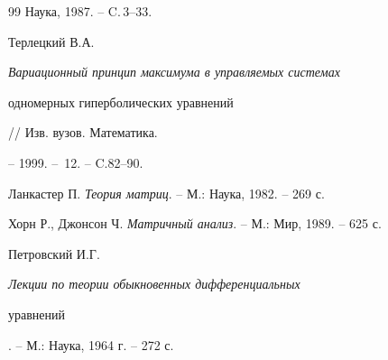 \begin{thebibliography}{99}
Наука, 1987. -- C.\,3--33.




Терлецкий В.А. {\it Вариационный принцип максимума в управляемых системах


одномерных гиперболических уравнений} // Изв. вузов. Математика.


-- 1999. -- \No\,12. -- C.82--90.




Ланкастер П. {\it Теория матриц}. -- М.: Наука, 1982. -- 269 с.




Хорн Р., Джонсон Ч. {\it Матричный анализ}. -- М.: Мир, 1989. -- 625 с.




Петровский И.Г. {\it Лекции по теории обыкновенных дифференциальных 


уравнений}. -- М.: Наука, 1964 г. -- 272 с.





\end{thebibliography}





\vskip 2cm












\label{end}





